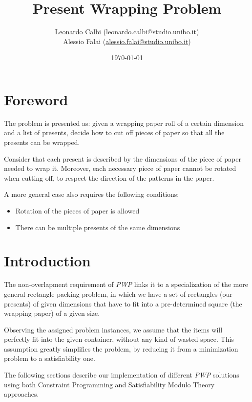 \documentclass[a4paper,10pt]{article}
\begin{document}
\title{Present Wrapping Problem}
\author{Leonardo Calbi (\href{mailto:leonardo.calbi@studio.unibo.it}{leonardo.calbi@studio.unibo.it}) \\ Alessio Falai (\href{mailto:alessio.falai@studio.unibo.it}{alessio.falai@studio.unibo.it})}
\date{\today}
\maketitle
\tableofcontents
\newpage

\section*{Foreword}
The problem is presented as: given a wrapping paper roll of a certain dimension and a list of presents, decide how to cut off pieces of paper so  that all the presents can be wrapped.

Consider that each present is described by the dimensions of the piece of paper needed to wrap it. Moreover, each necessary piece of paper cannot be rotated when cutting off, to respect the direction of the patterns in the paper.

A more general case also requires the following conditions:
\begin{itemize}
   \item Rotation of the pieces of paper is allowed
   \item There can be multiple presents of the same dimensions
\end{itemize}

\section{Introduction}
The non-overlapment requirement of \emph{PWP} links it to a specialization of the more general rectangle packing problem, in which we have a set of rectangles (our presents) of given dimensions that have to fit into a pre-determined square (the wrapping paper) of a given size.

Observing the assigned problem instances, we assume that the items will perfectly fit into the given container, without any kind of wasted space. This assumption greatly simplifies the problem, by reducing it from a minimization problem to a satisfiability one.

The following sections describe our implementation of different \emph{PWP} solutions using both Constraint Programming and Satisfiability Modulo Theory approaches.
\end{document}
